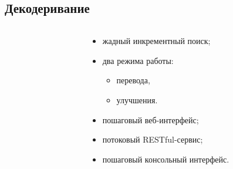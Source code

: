 
\subsection{Декодеривание}

\begin{frame}[t] %
	\begin{columns}
		\begin{column}{6.5cm}
		\end{column}
		\begin{column}{5cm}
			\small
			\begin{itemize}
				\item жадный инкрементный поиск;
				\item два режима работы:
				\begin{itemize}
					\item перевода,
					\item улучшения.
				\end{itemize}
				\item пошаговый веб-интерфейс;
				\item потоковый RESTful-сервис;
				\item пошаговый консольный интерфейс.
			\end{itemize}
		\end{column}
	\end{columns}
\end{frame}

